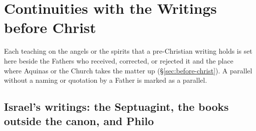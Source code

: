 \section{Continuities with the Writings before Christ}\label{app:continuities}

Each teaching on the angels or the spirits that a pre-Christian writing
holds is set here beside the Fathers who received, corrected, or rejected
it and the place where Aquinas or the Church takes the matter up
(\S\ref{sec:before-christ}). A parallel without a naming or quotation
by a Father is marked as a parallel.

\subsection*{Israel's writings: the Septuagint, the books outside the canon, and Philo}
\begingroup\footnotesize
